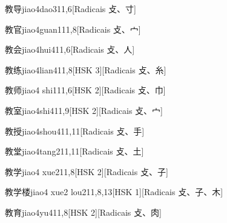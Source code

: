 \begin{entry}{教导}{jiao4dao3}{11,6}[Radicais ⽁、⼨]
\end{entry}

\begin{entry}{教官}{jiao4guan1}{11,8}[Radicais ⽁、⼧]
\end{entry}

\begin{entry}{教会}{jiao4hui4}{11,6}[Radicais ⽁、⼈]
\end{entry}

\begin{entry}{教练}{jiao4lian4}{11,8}[HSK 3][Radicais ⽁、⽷]
\end{entry}

\begin{entry}{教师}{jiao4 shi1}{11,6}[HSK 2][Radicais ⽁、⼱]
\end{entry}

\begin{entry}{教室}{jiao4shi4}{11,9}[HSK 2][Radicais ⽁、⼧]
\end{entry}

\begin{entry}{教授}{jiao4shou4}{11,11}[Radicais ⽁、⼿]
\end{entry}

\begin{entry}{教堂}{jiao4tang2}{11,11}[Radicais ⽁、⼟]
\end{entry}

\begin{entry}{教学}{jiao4 xue2}{11,8}[HSK 2][Radicais ⽁、⼦]
\end{entry}

\begin{entry}{教学楼}{jiao4 xue2 lou2}{11,8,13}[HSK 1][Radicais ⽁、⼦、⽊]
\end{entry}

\begin{entry}{教育}{jiao4yu4}{11,8}[HSK 2][Radicais ⽁、⾁]
\end{entry}

